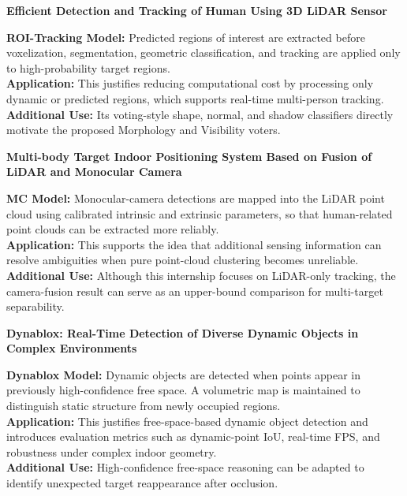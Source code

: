 \documentclass[11pt,a4paper]{report}
\newcommand{\boxitemtitle}[1]{
    \vspace{0.5em}
    {\large\textbf{\color{DeepBlue} #1}}\par
    \vspace{0.8em}
}
\begin{document}
\boxitemtitle{Efficient Detection and Tracking of Human Using 3D LiDAR Sensor~\cite{gomez2023efficient}}
\begin{contentbox}
    \textbf{ROI-Tracking Model:} Predicted regions of interest are extracted before voxelization, segmentation, geometric classification, and tracking are applied only to high-probability target regions. \\
    \textbf{Application:} This justifies reducing computational cost by processing only dynamic or predicted regions, which supports real-time multi-person tracking. \\
    \textbf{Additional Use:} Its voting-style shape, normal, and shadow classifiers directly motivate the proposed Morphology and Visibility voters.
\end{contentbox}

\boxitemtitle{Multi-body Target Indoor Positioning System Based on Fusion of LiDAR and Monocular Camera~\cite{xiong2022multibody}}
\begin{contentbox}
    \textbf{MC Model:} Monocular-camera detections are mapped into the LiDAR point cloud using calibrated intrinsic and extrinsic parameters, so that human-related point clouds can be extracted more reliably. \\
    \textbf{Application:} This supports the idea that additional sensing information can resolve ambiguities when pure point-cloud clustering becomes unreliable. \\
    \textbf{Additional Use:} Although this internship focuses on LiDAR-only tracking, the camera-fusion result can serve as an upper-bound comparison for multi-target separability.
\end{contentbox}

\boxitemtitle{Dynablox: Real-Time Detection of Diverse Dynamic Objects in Complex Environments~\cite{schmid2023dynablox}}
\begin{contentbox}
    \textbf{Dynablox Model:} Dynamic objects are detected when points appear in previously high-confidence free space. A volumetric map is maintained to distinguish static structure from newly occupied regions. \\
    \textbf{Application:} This justifies free-space-based dynamic object detection and introduces evaluation metrics such as dynamic-point IoU, real-time FPS, and robustness under complex indoor geometry. \\
    \textbf{Additional Use:} High-confidence free-space reasoning can be adapted to identify unexpected target reappearance after occlusion.
\end{contentbox}
\end{document}
